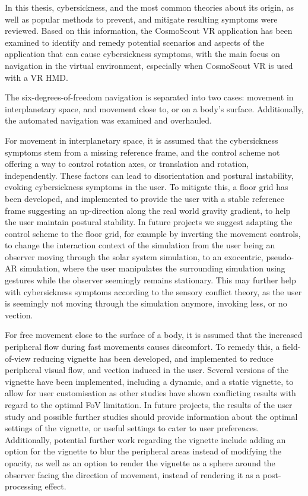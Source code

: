In this thesis, cybersickness, and the most common theories about its origin, as well as popular methods to prevent,
and mitigate resulting symptoms were reviewed.
Based on this information, the CosmoScout VR application has been examined to identify and remedy potential
scenarios and aspects of the application that can cause cybersickness symptoms, with the main focus on navigation in
the virtual environment, especially when CosmoScout VR is used with a VR HMD\@.

The six-degrees-of-freedom navigation is separated into two cases: movement in interplanetary space, and movement
close to, or on a body's surface.
Additionally, the automated navigation was examined and overhauled.

For movement in interplanetary space, it is assumed that the cybersickness symptoms stem from a missing reference
frame, and the control scheme not offering a way to control rotation axes, or translation and rotation, independently.
These factors can lead to disorientation and postural instability, evoking cybersickness symptoms in the user.
To mitigate this, a floor grid has been developed, and implemented to provide the user with a stable reference frame
suggesting an
up-direction along the real world gravity gradient, to help the user maintain postural stability.
In future projects we suggest adapting the control scheme to the floor grid, for example by inverting the movement
controls, to change the interaction context of the simulation from the user being an observer moving through the
solar system simulation, to an exocentric, pseudo-AR  simulation, where the user manipulates the surrounding
simulation using gestures while the observer seemingly remains stationary.
This may further help with cybersickness symptoms according to the sensory conflict theory, as the user is seemingly
not moving through the simulation anymore, invoking less, or no vection.

For free movement close to the surface of a body, it is assumed that the increased peripheral flow during fast
movements causes discomfort.
To remedy this, a field-of-view reducing vignette has been developed, and implemented to reduce peripheral visual flow,
and vection induced in the user.
Several versions of the vignette have been implemented, including a dynamic, and a static vignette, to allow for user
customisation as other studies have shown conflicting results with regard to the optimal FoV limitation.
In future projects, the results of the user study and possible further studies should provide information about the
optimal settings of the vignette, or useful settings to cater to user preferences.
Additionally, potential further work regarding the vignette include adding an option for the vignette to blur the
peripheral areas instead of modifying the opacity, as well as an option to render the vignette as a sphere around the
observer facing the direction of movement, instead of rendering it as a post-processing effect.

